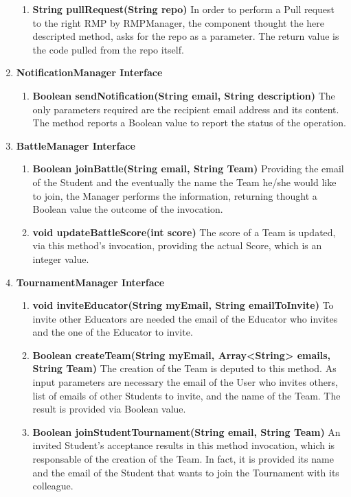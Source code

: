 \begin{enumerate}
\begin{enumerate}[label=$\bullet$]
            \item \textbf{String pullRequest(String repo)} In order to perform a Pull request to the right RMP by RMPManager, the component thought the here descripted method, asks for the repo as a parameter. The return value is the code pulled from the repo itself.
        \end{enumerate} 
    \item \textbf{NotificationManager Interface}
        \begin{enumerate}[label=$\bullet$]
            \item \textbf{Boolean sendNotification(String email, String description)} The only parameters required are the recipient email address and its content. The method reports a Boolean value to report the status of the operation.
        \end{enumerate}
    \item \textbf{BattleManager Interface}
        \begin{enumerate}[label=$\bullet$]
            \item \textbf{Boolean joinBattle(String email, String Team)} Providing the email of the Student and the eventually the name the Team he/she would like to join, the Manager performs the information, returning thought a Boolean value the outcome of the invocation.
            \item \textbf{void updateBattleScore(int score)} The score of a Team is updated, via this method's invocation, providing the actual Score, which is an integer value.
        \end{enumerate}
    \item \textbf{TournamentManager Interface}
        \begin{enumerate}[label=$\bullet$]
        \item \textbf{void inviteEducator(String myEmail, String emailToInvite)} To invite other Educators are needed the email of the Educator who invites and the one of the Educator to invite.
        \item \textbf{Boolean createTeam(String myEmail, Array<String> emails, String Team)} The creation of the Team is deputed to this method. As input parameters are necessary the email of the User who invites others, list of emails of other Students to invite, and the name of the Team. The result is provided via Boolean value. 
        \item \textbf{Boolean joinStudentTournament(String email, String Team)} An invited Student's acceptance results in this method invocation, which is responsable of the creation of the Team. In fact, it is provided its name and the email of the Student that wants to join the Tournament with its colleague.

\end{enumerate}
\end{enumerate}
